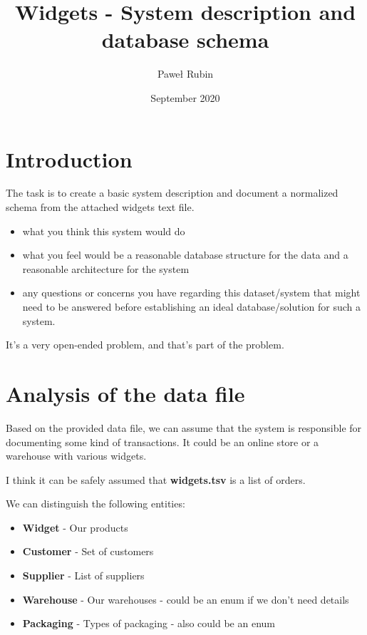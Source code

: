 \documentclass[8pt, a4paper]{article}
\title{Widgets - System description and database schema}
\author{Paweł Rubin}
\date{September 2020}
\begin{document}
\maketitle

\section*{Introduction}

The task is to create a basic system description and document a normalized schema from the attached widgets text file.  

\begin{itemize}
    \item  what you think this system would do
    \item  what you feel would be a reasonable database structure for the data and a reasonable architecture for the system
    \item  any questions or concerns you have regarding this dataset/system that might need to be answered before establishing an ideal database/solution for such a system.
\end{itemize}

It's a very open-ended problem, and that's part of the problem.

\section*{Analysis of the data file}

Based on the provided data file, we can assume that the system is responsible for documenting some kind of transactions. It could be an online store or a warehouse with various widgets.

\smallskip

\noindent
I think it can be safely assumed that \textbf{widgets.tsv} is a list of orders.


\medskip

\noindent
We can distinguish the following entities:
\begin{itemize}
    \item \textbf{Widget} - Our products
    \item \textbf{Customer} - Set of customers
    \item \textbf{Supplier} - List of suppliers
    \item \textbf{Warehouse} - Our warehouses - could be an enum if we don't need details
    \item \textbf{Packaging} - Types of packaging - also could be an enum
\end{itemize}
\end{document}
